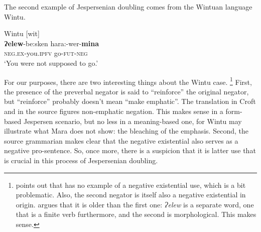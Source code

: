 ﻿\documentclass[output=paper]{langsci/langscibook}
\begin{document}
The second example of Jespersenian doubling comes from the Wintuan language Wintu.
%
\begin{exe}\ex\label{ex:int-wintu-go}
Wintu [wit] \\
    \gll \textbf{Ɂelew}-be:sken  hara:-wer-\textbf{mina} \\
\textsc{neg.ex}-you.\textsc{ipfv}  go-\textsc{fut}-\textsc{neg} \\
    \glt `You were not supposed to go.'
    \end{exe}
%
For our purposes, there are two interesting things about the Wintu
case.%
%
\footnote{\textcite[10]{Croft1991} points out that
\textcite{Pitkin1984}
has no example of a negative existential use, which is a bit problematic.
Also,  the second negator is itself also a negative existential in origin.
\textcite[10]{Croft1991} argues that it is older than the first one:
\textit{Ɂelew} is a separate word, one that is a finite verb furthermore,
and the second is morphological. This makes sense.}  %
%
First, the presence of the preverbal negator is said to ``reinforce''
\parencite[10]{Croft1991} the
original negator, but ``reinforce'' probably doesn't mean ``make emphatic''.
The translation in Croft and in the source figures non-emphatic negation.
This makes sense in a form-based Jespersen scenario, but no less in a
meaning-based one, for Wintu may illustrate what Mara does not show: the
bleaching of the emphasis. Second, the source grammarian
\textcite[197]{Pitkin1984} makes clear that the negative existential also
serves as a negative pro-sentence. So, once more, there is a suspicion that
it is latter use that is crucial in this process of Jespersenian doubling.
\end{document}
